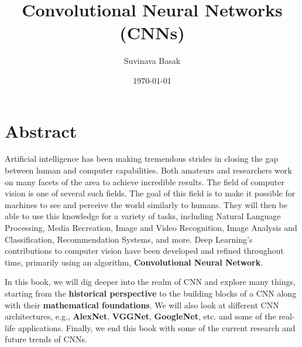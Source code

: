 \documentclass[a4paper,12pt]{book} %
\begin{document}
\pagestyle{fancy}
\fancyhead{} %
\fancyhead[LO,RE]{\small\nouppercase{\rightmark}}
\fancyfoot{} %
\fancyhead[LE,RO]{\small\thepage}
\renewcommand{\headrulewidth}{0pt}

\title{\textbf{Convolutional Neural Networks (CNNs)}}
\author{Suvinava Basak}
\date{\today}
\maketitle

\cleardoublepage

\titleformat{\section}[block]
{\normalfont\Huge\bfseries}{}{0pt}{}

\newpage
\vspace*{5cm} %
\section*{Abstract}
Artificial intelligence has been making tremendous strides in closing the gap between human and computer capabilities. Both amateurs and researchers work on many facets of the area to achieve incredible results. The field of computer vision is one of several such fields.
The goal of this field is to make it possible for machines to see and perceive the world similarly to humans. They will then be able to use this knowledge for a variety of tasks, including Natural Language Processing, Media Recreation, Image and Video Recognition, Image Analysis and Classification, Recommendation Systems, and more. Deep Learning's contributions to computer vision have been developed and refined throughout time, primarily using an algorithm, \textbf{Convolutional Neural Network}.

\setlength{\parskip}{1em} %
\setlength{\parindent}{15pt} %
In this book, we will dig deeper into the realm of CNN and explore many things, starting from the \textbf{historical perspective} to the building blocks of a CNN along with their \textbf{mathematical foundations}. We will also look at different CNN architectures, e.g., \textbf{AlexNet}, \textbf{VGGNet}, \textbf{GoogleNet}, etc. and some of the real-life applications. Finally, we end this book with some of the current research and future trends of CNNs.
\end{document}
